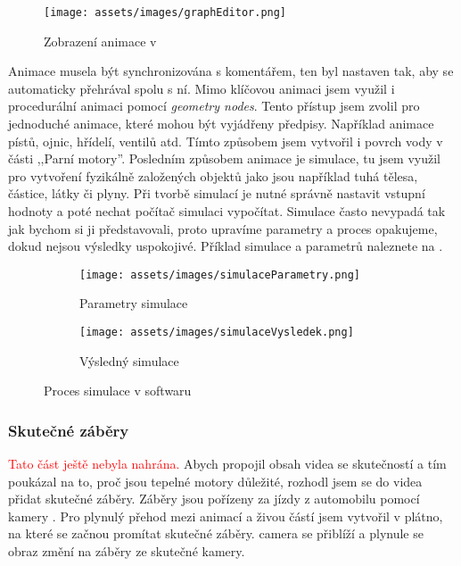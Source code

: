 \begin{figure}[H]
    \centering
    \texttt{[image: assets/images/graphEditor.png]}
    \caption{Zobrazení animace v  \jaObr}
    \label{obr:grafEditor}
\end{figure}

{Animace musela být synchronizována s komentářem, ten byl nastaven tak, aby se automaticky přehrával spolu s ní. Mimo klíčovou animaci jsem využil i procedurální animaci pomocí \textit{geometry nodes}. Tento přístup jsem zvolil pro jednoduché animace, které mohou být vyjádřeny předpisy. Například animace pístů, ojnic, hřídelí, ventilů atd. Tímto způsobem jsem vytvořil i povrch vody v části ,,Parní motory''.}\odst
{Posledním způsobem animace je simulace, tu jsem využil pro vytvoření fyzikálně založených objektů jako jsou například tuhá tělesa, částice, látky či plyny. Při tvorbě simulací je nutné správně nastavit vstupní hodnoty a poté nechat počítač simulaci vypočítat. Simulace často nevypadá tak jak bychom si ji představovali, proto upravíme parametry a proces opakujeme, dokud nejsou výsledky uspokojivé. Příklad simulace a parametrů naleznete na .}

\begin{figure}[H]
    \centering
    \begin{subfigure}{0.35\textwidth}
        \centering
        \texttt{[image: assets/images/simulaceParametry.png]}
        \caption{Parametry simulace\\\jaObr}
    \end{subfigure}%
    \begin{subfigure}{0.6\textwidth}
        \centering
        \texttt{[image: assets/images/simulaceVysledek.png]}
        \caption{Výsledný simulace \jaObr}
    \end{subfigure}
    \caption{Proces simulace v softwaru }
    \label{obr:simulace}
\end{figure}

\newpage

\subsubsection{Skutečné záběry}
\textcolor{red}{Tato část ještě nebyla nahrána.}\odst
{Abych propojil obsah videa se skutečností a tím poukázal na to, proč jsou tepelné motory důležité, rozhodl jsem se do videa přidat skutečné záběry. Záběry jsou pořízeny za jízdy z automobilu pomocí kamery .}\odst
{Pro plynulý přehod mezi animací a živou částí jsem vytvořil v  plátno, na které se začnou promítat skutečné záběry.  camera se přiblíží a plynule se obraz změní na záběry ze skutečné kamery.}

